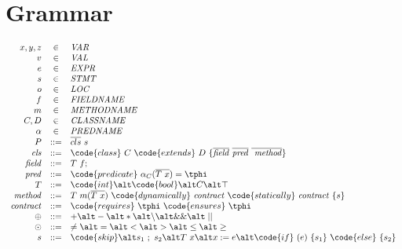 \section{Grammar}

\begin{spacing}{1.5}
\begin{align*}
\begin{array}{rcl}
%
%
x,y,z  &\in& \mathit{VAR} \\
v      &\in& \mathit{VAL} \\
e      &\in& \mathit{EXPR} \\
s      &\in& \mathit{STMT} \\
o      &\in& \mathit{LOC} \\
f      &\in& \mathit{FIELDNAME} \\
m      &\in& \mathit{METHODNAME} \\
C,D    &\in& \mathit{CLASSNAME} \\
\alpha &\in& \mathit{PREDNAME} \\
%
%
P                 &::=& \overline{cls} \ s \\
\mathit{cls}      &::=& \code{class} \ C \ \code{extends} \ D \ \{ \overline{\mathit{field}} \ \overline{\mathit{pred}} \ \overline{\ \mathit{method}} \} \\
\mathit{field}    &::=& T \ f; \\
\mathit{pred}     &::=& \code{predicate} \ \alpha_C(\overline{T \ x}) = \tphi \\
T                 &::=& \code{int} \alt \code{bool} \alt C \alt \top \\
\mathit{method}   &::=& T \ m (\overline{T \ x}) \ \code{dynamically} \ \mathit{contract} \ \code{statically} \ \mathit{contract} \ \{ s \} \\
\mathit{contract} &::=& \code{requires} \ \tphi \ \code{ensures} \ \tphi \\
\oplus            &::=& + \alt - \alt \ast \alt \backslash \alt \&\& \alt \mid\mid \\
\odot             &::=& \neq \alt = \alt < \alt > \alt \leq \alt \geq \\
s                 &::=& \code{skip}
                       \alt s_1 \ ; \ s_2
                       \alt T\ x \alt x := e
                       \alt \code{if} \ (e) \ \{s_1\} \ \code{else} \ \{s_2\} \\ &&

\end{array}
\end{align*}
\end{spacing}
